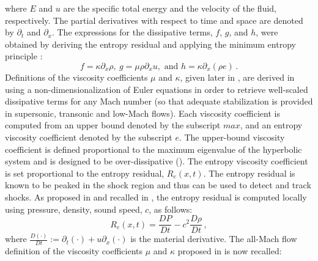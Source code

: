 \documentclass{inputs/mc2015}
\begin{document}
%
where $E$ and $u$ are the specific total energy and the velocity of the fluid, respectively. The partial derivatives with respect to time and space are denoted by $\partial_t$ and $\partial_x$. The expressions for the dissipative terms, $f$, $g$, and $h$, were obtained by deriving the entropy residual and applying the minimum entropy principle \cite{jlg}:
%
\begin{equation}
f = \kappa \partial_x \rho , \ g = \mu \rho \partial_x u, \text{  and  } h = \kappa \partial_x \left( \rho e \right) \, . 
\end{equation}
%
Definitions of the viscosity coefficients $\mu$ and $\kappa$, given later in , are derived in \cite{Marco_paper_low_mach} using a non-dimensionalization of Euler equations in order to retrieve well-scaled dissipative terms for any Mach number (so that adequate stabilization is provided in supersonic, transonic and low-Mach flows). Each viscosity coefficient is computed from an upper bound denoted by the subscript $max$, and an entropy viscosity coefficient denoted by the subscript $e$. The upper-bound viscosity coefficient is defined proportional to the maximum eigenvalue of the hyperbolic system and is designed to be over-dissipative (). The entropy viscosity coefficient is set proportional to the entropy residual, $R_e(x,t)$.
The entropy residual is known to be peaked in the shock region \cite{Leveque} and thus can be used to detect and track shocks. As proposed in \cite{Marco_paper_low_mach} and recalled in , the entropy residual is computed locally using pressure, density, sound speed, $c$, as follows:
%
\begin{equation}\label{eq:ent-res}
R_e(x,t) = \frac{DP}{Dt} - c^2\frac{D\rho}{Dt} \, ,
\end{equation}
%
where $\frac{D (\cdot)}{Dt} := \partial_t(\cdot) + u  \partial_x(\cdot)$ is the material derivative. 
The all-Mach flow definition of the viscosity coefficients $\mu$ and $\kappa$ proposed in \cite{Marco_paper_low_mach} is now recalled:
\end{document}
